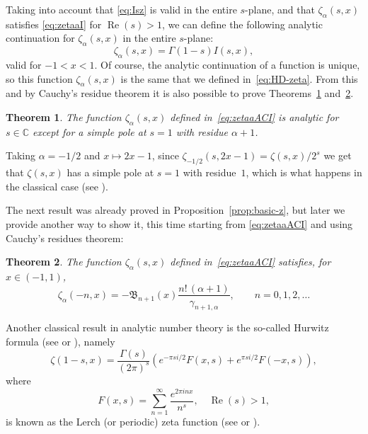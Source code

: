 \documentclass[a4paper]{amsart}
\newcommand{\C}{\mathbb{C}}
\newcommand{\B}{\mathfrak{B}}
\renewcommand{\Re}{\operatorname{Re}}
\theoremstyle{plain}
\newtheorem{theorem}{Theorem}[section]
\theoremstyle{definition}
\theoremstyle{remark}
\numberwithin{equation}{section}
\begin{document}
Taking into account that \eqref{eq:Isz} is valid in the entire $s$-plane, and that $\zeta_{\alpha}(s,x)$ satisfies \eqref{eq:zetaaI} for $\Re(s)>1$, we can define the following analytic continuation for $\zeta_{\alpha}(s,x)$ in the entire $s$-plane:
\begin{equation}
\label{eq:zetaaACI}
    \zeta_{\alpha}(s,x) = \Gamma(1-s) I(s,x),
\end{equation}
valid for $-1<x<1$. Of course, the analytic continuation of a function is unique, so this function $\zeta_{\alpha}(s,x)$ is the same that we defined in~\eqref{eq:HD-zeta}. From this and by Cauchy's residue theorem it is also possible to prove Theorems~\ref{teo:reszeta1} and~\ref{teo:zeta-n}.

\begin{theorem}
\label{teo:reszeta1}
The function $\zeta_{\alpha}(s,x)$ defined in~\eqref{eq:zetaaACI} is analytic for $s \in \C$ except for a simple pole at $s=1$ with residue $\alpha+1$.
\end{theorem}

Taking $\alpha = -1/2$ and $x \mapsto 2x-1$, since $\zeta_{-1/2}(s,2x-1) = \zeta(s,x)/2^s$ we get that $\zeta(s,x)$ has a simple pole at $s=1$ with residue~$1$, which is what happens in the classical case (see \cite[\S\,12.5, Theorem~12.4]{Ap-ANT}).

The next result was already proved in Proposition~\ref{prop:basic-z}, but later we provide another way to show it, this time starting from \eqref{eq:zetaaACI} and using Cauchy's residues theorem:

\begin{theorem}
\label{teo:zeta-n}
The function $\zeta_{\alpha}(s,x)$ defined in~\eqref{eq:zetaaACI} satisfies, for $x \in (-1,1)$,
\begin{equation}
\label{eq:zeta-n}
\zeta_\alpha(-n,x) = -\B_{n+1}(x)\frac{n!\,(\alpha+1)}{\gamma_{n+1,\alpha}},
\qquad n=0,1,2,\dots
\end{equation}
\end{theorem} 

Another classical result in analytic number theory is the so-called Hurwitz formula (see \cite[\S\,12.7, Theorem 12.6]{Ap-ANT} or \cite[25.13.3]{Ap-NIST}), namely
\begin{equation}
\label{eq:H-form}
\zeta(1-s,x) = \frac{\Gamma(s)}{(2\pi)^s} \left(e^{-\pi s i/2} F(x,s)
+ e^{\pi s i/2} F(-x,s)\right),
\end{equation}
where
\begin{equation}
\label{eq:Fxs}
F(x,s) = \sum_{n=1}^{\infty} \frac{e^{2\pi i n x}}{n^s},
\quad \Re(s) > 1,
\end{equation}
is known as the Lerch (or periodic) zeta function (see \cite[\S\,12.7, equation~(9), p.~257]{Ap-ANT} or \cite[25.13.1]{Ap-NIST}).
\end{document}
